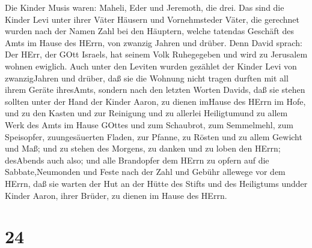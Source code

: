  Die Kinder Musis waren: Maheli, Eder und Jeremoth, die
drei.  Das sind die Kinder Levi unter ihrer Väter Häusern
und Vornehmsteder Väter, die gerechnet wurden nach der Namen Zahl bei
den Häuptern, welche tatendas Geschäft des Amts im Hause des HErrn, von
zwanzig Jahren und drüber.  Denn David sprach: Der HErr,
der GOtt Israels, hat seinem Volk Ruhegegeben und wird zu Jerusalem
wohnen ewiglich.  Auch unter den Leviten wurden gezählet
der Kinder Levi von zwanzigJahren und drüber, daß sie die Wohnung nicht
tragen durften mit all ihrem Geräte ihresAmts,  sondern
nach den letzten Worten Davids,  daß sie stehen sollten
unter der Hand der Kinder Aaron, zu dienen imHause des HErrn im Hofe,
und zu den Kasten und zur Reinigung und zu allerlei Heiligtumund zu
allem Werk des Amts im Hause GOttes  und zum Schaubrot, zum
Semmelmehl, zum Speisopfer, zuungesäuerten Fladen, zur Pfanne, zu Rösten
und zu allem Gewicht und Maß;  und zu stehen des Morgens,
zu danken und zu loben den HErrn; desAbends auch also;  und
alle Brandopfer dem HErrn zu opfern auf die Sabbate,Neumonden und Feste
nach der Zahl und Gebühr allewege vor dem HErrn,  daß sie
warten der Hut an der Hütte des Stifts und des Heiligtums undder Kinder
Aaron, ihrer Brüder, zu dienen im Hause des HErrn.

\hypertarget{section-23}{%
\section{24}\label{section-23}}

